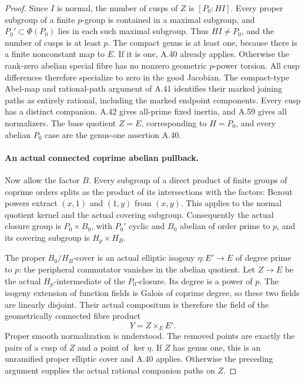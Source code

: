 \begin{proof}
Since \(I\) is normal, the number of cusps of \(Z\)
is \([P_0:HI]\). Every proper subgroup of a finite
\(p\)-group is contained in a maximal subgroup, and
\(P_0'\subset\Phi(P_0)\) lies in each such maximal
subgroup. Thus \(HI\ne P_0\), and the number of
cusps is at least \(p\). The compact genus is at
least one, because there is a finite nonconstant map to
\(E\). If it is one, A.40 already applies.
Otherwise the rank-zero abelian special fibre has no
nonzero geometric \(p\)-power torsion. All cusp differences
therefore specialize to zero in the good Jacobian.
The compact-type Abel-map and rational-path argument of
A.41 identifies their marked joining paths as entirely
rational, including the marked endpoint components.
Every cusp has a distinct companion. A.42 gives all-prime
fixed inertia, and A.59 gives all normalizers. The base
quotient \(Z=E\), corresponding to \(H=P_0\), and every abelian \(P_0\)
case are the genus-one assertion A.40.

\paragraph{An actual connected coprime abelian pullback.}
Now allow the factor \(B\). Every subgroup of a direct
product of finite groups of coprime orders splits as the
product of its intersections with the factors: Bezout
powers extract \((x,1)\) and \((1,y)\) from \((x,y)\).
This applies to the normal quotient kernel and the actual
covering subgroup. Consequently the actual closure group
is \(P_0\times B_0\), with \(P_0'\) cyclic and
\(B_0\) abelian of order prime to \(p\), and its
covering subgroup is \(H_p\times H_B\).

The proper \(B_0/H_B\)-cover is an actual elliptic
isogeny \(\eta:E'\to E\) of degree prime to \(p\):
the peripheral commutator vanishes in the abelian quotient.
Let \(Z\to E\) be the actual \(H_p\)-intermediate
of the \(P_0\)-closure. Its degree is a power of \(p\).
The isogeny extension of function fields is Galois of
coprime degree, so these two fields are linearly disjoint.
Their actual compositum is therefore the field of the
geometrically connected fibre product
\[
                              Y=Z\times_E E'.           \tag{A.79.3}
\]
Proper smooth normalization is understood. The removed
points are exactly the pairs of a cusp of \(Z\) and
a point of \(\ker\eta\). If \(Z\) has genus one,
this is an unramified proper elliptic cover and A.40
applies. Otherwise the preceding argument supplies the
actual rational companion paths on \(Z\).


\end{proof}
